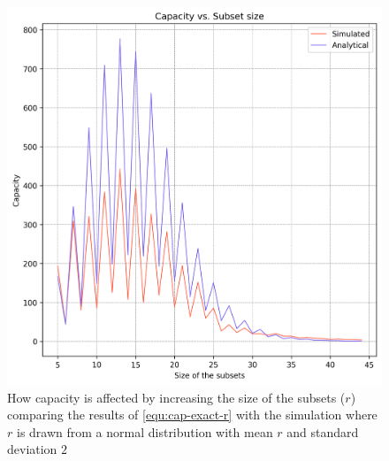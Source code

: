         \begin{figure}%
            \centering
            \includegraphics[scale=0.83]{figures/cap-vs-r-bounded-exact-2.png}
            \caption[Capacity vs. Size of the subsets ($r$) when $r \sim \mathcal{N}(r,2)$]{How capacity is affected by increasing the size of the subsets ($r$) comparing the results of \ref{equ:cap-exact-r} with the simulation where $r$ is drawn from a normal distribution with mean $r$ and standard deviation $2$}
            \label{figure:cap-vs-r-bounded-exact-2}
            \end{figure}

